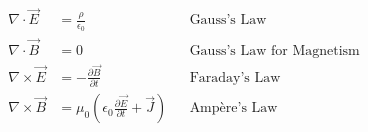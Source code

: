 \begin{align}
    \nabla \cdot \vec{E} &= \frac{\rho}{\epsilon_0} && \text{Gauss's Law} \\
    \nabla \cdot \vec{B} &= 0 && \text{Gauss's Law for Magnetism} \\
    \nabla \times \vec{E} &= -\frac{\partial \vec{B}}{\partial t} && \text{Faraday's Law} \\
    \nabla \times \vec{B} &= \mu_0 \left( \epsilon_0 \frac{\partial \vec{E}}{\partial t} + \vec{J} \right) && \text{Ampère's Law}
\end{align}
